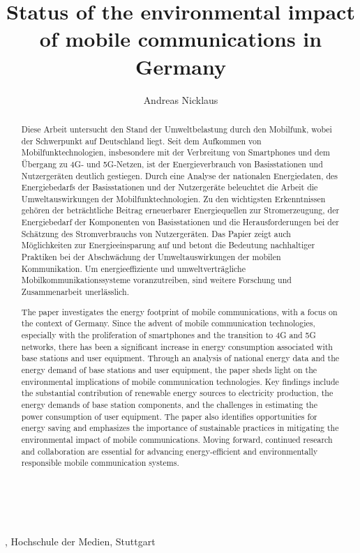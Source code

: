 \documentclass[11pt,a4paper]{article}
\title{Status of the environmental impact of mobile communications in Germany}
\author{Andreas Nicklaus}
\makeatletter
\renewcommand\maketitle{
{\raggedright
\begin{center}
{\Large \bfseries \@title}\\[2ex] 
\@author\\[1ex] 
\@date, Hochschule der Medien, Stuttgart\\[1ex]
\end{center}}}
\makeatother
\begin{document}
\maketitle

\begin{abstract}
  Diese Arbeit untersucht den Stand der Umweltbelastung durch den Mobilfunk, wobei der Schwerpunkt auf Deutschland liegt.
  Seit dem Aufkommen von Mobilfunktechnologien, insbesondere mit der Verbreitung von Smartphones und dem Übergang zu 4G- und 5G-Netzen, ist der Energieverbrauch von Basisstationen und Nutzergeräten deutlich gestiegen.
  Durch eine Analyse der nationalen Energiedaten, des Energiebedarfs der Basisstationen und der Nutzergeräte beleuchtet die Arbeit die Umweltauswirkungen der Mobilfunktechnologien.
  Zu den wichtigsten Erkenntnissen gehören der beträchtliche Beitrag erneuerbarer Energiequellen zur Stromerzeugung, der Energiebedarf der Komponenten von Basisstationen und die Herausforderungen bei der Schätzung des Stromverbrauchs von Nutzergeräten.
  Das Papier zeigt auch Möglichkeiten zur Energieeinsparung auf und betont die Bedeutung nachhaltiger Praktiken bei der Abschwächung der Umweltauswirkungen der mobilen Kommunikation.
  Um energieeffiziente und umweltverträgliche Mobilkommunikationssysteme voranzutreiben, sind weitere Forschung und Zusammenarbeit unerlässlich.
\end{abstract}

\begin{abstract}
  The paper investigates the energy footprint of mobile communications, with a focus on the context of Germany.
  Since the advent of mobile communication technologies, especially with the proliferation of smartphones and the transition to 4G and 5G networks, there has been a significant increase in energy consumption associated with base stations and user equipment.
  Through an analysis of national energy data and the energy demand of base stations and user equipment, the paper sheds light on the environmental implications of mobile communication technologies.
  Key findings include the substantial contribution of renewable energy sources to electricity production, the energy demands of base station components, and the challenges in estimating the power consumption of user equipment.
  The paper also identifies opportunities for energy saving and emphasizes the importance of sustainable practices in mitigating the environmental impact of mobile communications.
  Moving forward, continued research and collaboration are essential for advancing energy-efficient and environmentally responsible mobile communication systems.
\end{abstract}
\end{document}
